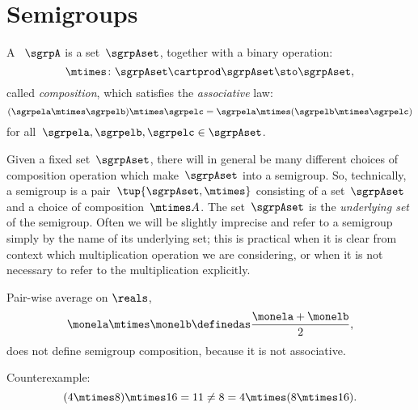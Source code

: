 

\section{Semigroups}
\label{sec:semigroups}

\begin{ctdefinition}[Semigroup]
  \label{def:semigroup}
  A \emph{}~$\sgrpA$ is a set~$\sgrpAset$, together with a binary operation:
  \begin{equation}
    \mtimes  \colon \sgrpAset \cartprod \sgrpAset \sto \sgrpAset,
  \end{equation}
  called \emph{composition}, which satisfies the \emph{associative} law:
  \begin{equation}
    \label{eq:semigroup-associative}
    (\sgrpela \mtimes   \sgrpelb)\mtimes   \sgrpelc
    = \sgrpela \mtimes   (\sgrpelb \mtimes  \sgrpelc)
  \end{equation}
  for all~$\sgrpela , \sgrpelb, \sgrpelc \in \sgrpAset$.
\end{ctdefinition}



\begin{remark}
  Given a fixed set~$\sgrpAset$, there will in general be many different choices of composition operation which make~$\sgrpAset$ into a semigroup.
  So, technically, a semigroup is a pair~$\tup{\sgrpAset, \mtimes}$ consisting of a set~$\sgrpAset$ and a choice of composition~$\mtimes A$.
  The set~$\sgrpAset$ is the \emph{underlying set} of the semigroup.
  Often we will be slightly imprecise and refer to a semigroup simply by the name of its underlying set;
  this is practical when it is clear from context which multiplication operation we are considering, or when it is not necessary to refer to the multiplication explicitly.
\end{remark}



\begin{example}
  Pair-wise average on $\reals$,
  \begin{equation}
    \label{eq:pairwise}
    \monela \mtimes \monelb \definedas  \frac{\monela + \monelb}{2},
  \end{equation}
  does not define semigroup composition, because it is not associative.

  Counterexample:
  \begin{equation}
    \label{eq:pairwise-counterexample}
    (4 \mtimes 8) \mtimes 16 = 11 \neq  8 = 4 \mtimes (8 \mtimes 16).
  \end{equation}
\end{example}



